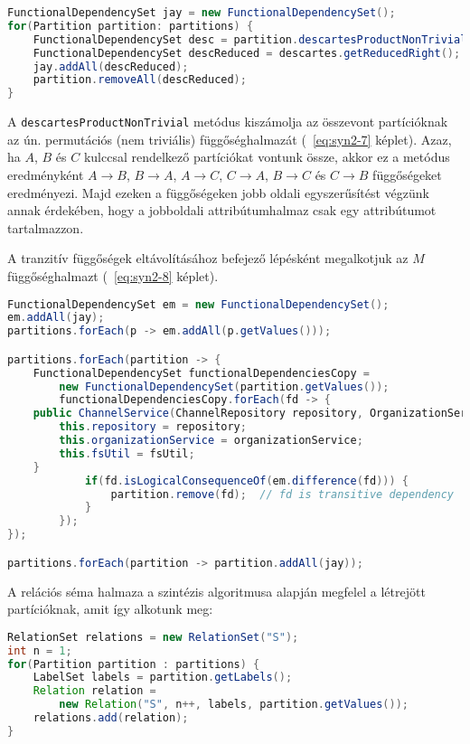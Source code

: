 \linespread{1}
\begin{lstlisting}[language=Java]
FunctionalDependencySet jay = new FunctionalDependencySet();
for(Partition partition: partitions) {
	FunctionalDependencySet desc = partition.descartesProductNonTrivial();
	FunctionalDependencySet descReduced = descartes.getReducedRight();
	jay.addAll(descReduced);
	partition.removeAll(descReduced);
}
\end{lstlisting}

A \lstinline{descartesProductNonTrivial} metódus kiszámolja az összevont partícióknak az ún. permutációs (nem triviális) függőséghalmazát (~\ref{eq:syn2-7} képlet). Azaz, ha $A$, $B$ és $C$ kulccsal rendelkező partíciókat vontunk össze, akkor ez a metódus eredményként $A \to B$, $B \to A$, $A \to C$, $C \to A$, $B \to C$ és $C \to B$ függőségeket eredményezi. Majd ezeken a függőségeken jobb oldali egyszerűsítést végzünk annak érdekében, hogy a jobboldali attribútumhalmaz csak egy attribútumot tartalmazzon.

A tranzitív függőségek eltávolításához befejező lépésként megalkotjuk az $M$ függőséghalmazt (~\ref{eq:syn2-8} képlet).

\linespread{1}
\begin{lstlisting}[language=Java]
FunctionalDependencySet em = new FunctionalDependencySet();
em.addAll(jay);
partitions.forEach(p -> em.addAll(p.getValues()));

partitions.forEach(partition -> {
	FunctionalDependencySet functionalDependenciesCopy =
		new FunctionalDependencySet(partition.getValues());
		functionalDependenciesCopy.forEach(fd -> {
    public ChannelService(ChannelRepository repository, OrganizationService organizationService, FilesystemUtil fsUtil) {
        this.repository = repository;
        this.organizationService = organizationService;
        this.fsUtil = fsUtil;
    }
			if(fd.isLogicalConsequenceOf(em.difference(fd))) {
				partition.remove(fd);  // fd is transitive dependency
			}
		});
});

partitions.forEach(partition -> partition.addAll(jay));
\end{lstlisting}

A relációs séma halmaza a szintézis algoritmusa alapján megfelel a létrejött partícióknak, amit így alkotunk meg:

\linespread{1}
\begin{lstlisting}[language=Java]
RelationSet relations = new RelationSet("S");
int n = 1;
for(Partition partition : partitions) {
	LabelSet labels = partition.getLabels();
	Relation relation = 
		new Relation("S", n++, labels, partition.getValues());
	relations.add(relation);
}
\end{lstlisting}

